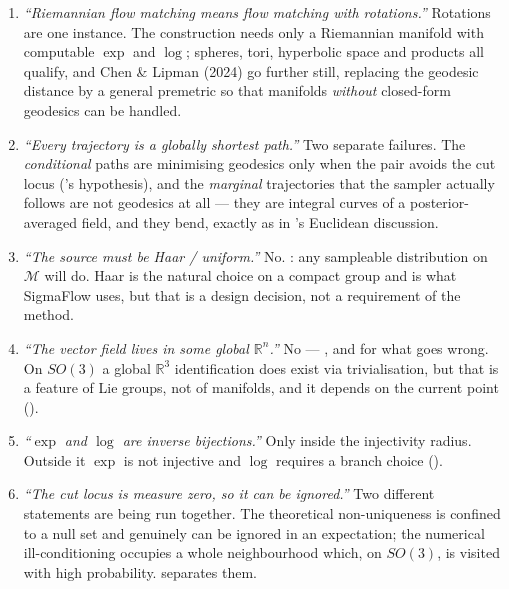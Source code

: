 \documentclass[11pt,a4paper]{report}
\theoremstyle{definition}
\theoremstyle{remark}
\newcommand{\RR}{\mathbb R}
\begin{document}
\begin{enumerate}
\item \emph{``Riemannian flow matching means flow matching with rotations.''}
      Rotations are one instance. The construction needs only a Riemannian
      manifold with computable $\exp$ and $\log$; spheres, tori, hyperbolic
      space and products all qualify, and Chen \& Lipman (2024) go further
      still, replacing the geodesic distance by a general premetric so that
      manifolds \emph{without} closed-form geodesics can be handled.

\item \emph{``Every trajectory is a globally shortest path.''}
      Two separate failures. The \emph{conditional} paths are minimising
      geodesics only when the pair avoids the cut locus
      ('s hypothesis), and the \emph{marginal}
      trajectories that the sampler actually follows are not geodesics at
      all --- they are integral curves of a posterior-averaged field, and
      they bend, exactly as in 's Euclidean
      discussion.

\item \emph{``The source must be Haar / uniform.''}
      No. : any sampleable distribution on
      $\mathcal M$ will do. Haar is the natural choice on a compact group
      and is what SigmaFlow uses, but that is a design decision, not a
      requirement of the method.

\item \emph{``The vector field lives in some global $\RR^n$.''}
      No --- , and  for
      what goes wrong. On $SO(3)$ a global $\RR^3$ identification does exist
      via trivialisation, but that is a feature of Lie groups, not of
      manifolds, and it depends on the current point
      ().

\item \emph{``$\exp$ and $\log$ are inverse bijections.''}
      Only inside the injectivity radius. Outside it $\exp$ is not
      injective and $\log$ requires a branch choice
      ().

\item \emph{``The cut locus is measure zero, so it can be ignored.''}
      Two different statements are being run together. The theoretical
      non-uniqueness is confined to a null set and genuinely can be ignored
      in an expectation; the numerical ill-conditioning occupies a whole
      neighbourhood which, on $SO(3)$, is visited with high probability.
       separates them.


\end{enumerate}
\end{document}
